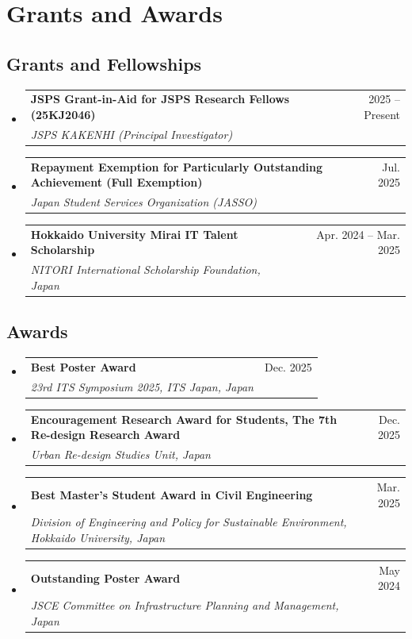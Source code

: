 \documentclass[letterpaper,11pt]{article}
\makeatletter
\newcommand{\resumeSubheading}[4]{
  \vspace{-2pt}\item
    \begin{tabular*}{0.97\textwidth}[t]{l@{\extracolsep{\fill}}r}
      \textbf{#1} & #2 \\
      \textit{\small #3} & \textit{\small #4} \\
    \end{tabular*}\vspace{-5pt}
}
\newcommand{\resumeSubHeadingListStart}{\begin{itemize}[leftmargin=0.15in, label={}]}
\newcommand{\resumeSubHeadingListEnd}{\end{itemize}}
\makeatother
\begin{document}
\section{Grants and Awards}
\subsection*{Grants and Fellowships}
\resumeSubHeadingListStart
    \resumeSubheading
    {JSPS Grant-in-Aid for JSPS Research Fellows (25KJ2046)}{2025 -- Present}
    {JSPS KAKENHI (Principal Investigator)}{}
    \resumeSubheading
    {Repayment Exemption for Particularly Outstanding Achievement (Full Exemption)}{Jul. 2025}
    {Japan Student Services Organization (JASSO)}{}
    \resumeSubheading
    {Hokkaido University Mirai IT Talent Scholarship}{Apr. 2024 -- Mar. 2025}
    {NITORI International Scholarship Foundation, Japan}{}
\resumeSubHeadingListEnd

\subsection*{Awards}
\resumeSubHeadingListStart
    \resumeSubheading
    {Best Poster Award}{Dec. 2025}
    {23rd ITS Symposium 2025, ITS Japan, Japan}{}
    \resumeSubheading
    {Encouragement Research Award for Students, The 7th Re-design Research Award}{Dec. 2025}
    {Urban Re-design Studies Unit, Japan}{}
    \resumeSubheading
    {Best Master's Student Award in Civil Engineering}{Mar. 2025}
    {Division of Engineering and Policy for Sustainable Environment, Hokkaido University, Japan}{}
    \resumeSubheading
    {Outstanding Poster Award}{May 2024}
    {JSCE Committee on Infrastructure Planning and Management, Japan}{}
\resumeSubHeadingListEnd
\end{document}
